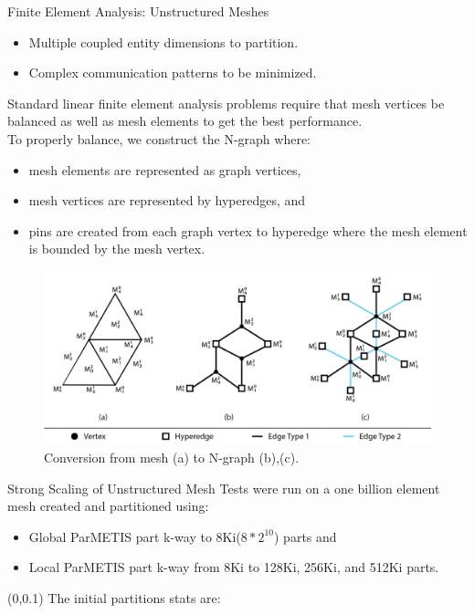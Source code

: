 \documentclass{beamer}
\begin{document}
\begin{textblock}{15.6}
\begin{textblock}{5}
\begin{block}{\centering Finite Element Analysis: Unstructured Meshes}
\begin{itemize}
      \item Multiple coupled entity dimensions to partition.
      \item Complex communication patterns to be minimized.
      \end{itemize}
      Standard linear finite element analysis problems require that mesh vertices be balanced as well as mesh elements to get the best performance.\\
      To properly balance, we construct the N-graph where:
      \begin{itemize}
      \item mesh elements are represented as graph vertices,
      \item mesh vertices are represented by hyperedges, and
      \item pins are created from each graph vertex to hyperedge where the mesh element is bounded by the mesh vertex.
      \end{itemize}
      \begin{figure}
        \centering
        \includegraphics[width=.7\textwidth]{../figures/exampleMesh2Graph_backgroundless.png}
        \caption{Conversion from mesh (a) to N-graph (b),(c).}
      \end{figure}
    \end{block}
    \begin{block}{\centering Strong Scaling of Unstructured Mesh}
      Tests were run on a one billion element mesh created and partitioned using:
      \begin{itemize}
      \item Global ParMETIS part k-way to 8Ki($8*2^{10}$) parts and
      \item Local ParMETIS part k-way from 8Ki to 128Ki, 256Ki, and 512Ki parts.
      \end{itemize}
      \begin{textblock}{2.3}(0,0.1)
        The initial partitions stats are: \\[1cm]


\end{textblock}
\end{block}
\end{textblock}
\end{textblock}
\end{document}

